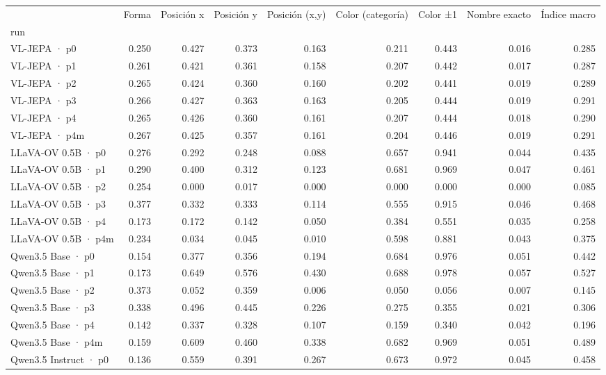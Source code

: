 \begin{tabular}{lrrrrrrrr}
\toprule
 & Forma & Posición x & Posición y & Posición (x,y) & Color (categoría) & Color ±1 & Nombre exacto & Índice macro \\
run &  &  &  &  &  &  &  &  \\
\midrule
VL-JEPA · p0 & 0.250 & 0.427 & 0.373 & 0.163 & 0.211 & 0.443 & 0.016 & 0.285 \\
VL-JEPA · p1 & 0.261 & 0.421 & 0.361 & 0.158 & 0.207 & 0.442 & 0.017 & 0.287 \\
VL-JEPA · p2 & 0.265 & 0.424 & 0.360 & 0.160 & 0.202 & 0.441 & 0.019 & 0.289 \\
VL-JEPA · p3 & 0.266 & 0.427 & 0.363 & 0.163 & 0.205 & 0.444 & 0.019 & 0.291 \\
VL-JEPA · p4 & 0.265 & 0.426 & 0.360 & 0.161 & 0.207 & 0.444 & 0.018 & 0.290 \\
VL-JEPA · p4m & 0.267 & 0.425 & 0.357 & 0.161 & 0.204 & 0.446 & 0.019 & 0.291 \\
LLaVA-OV 0.5B · p0 & 0.276 & 0.292 & 0.248 & 0.088 & 0.657 & 0.941 & 0.044 & 0.435 \\
LLaVA-OV 0.5B · p1 & 0.290 & 0.400 & 0.312 & 0.123 & 0.681 & 0.969 & 0.047 & 0.461 \\
LLaVA-OV 0.5B · p2 & 0.254 & 0.000 & 0.017 & 0.000 & 0.000 & 0.000 & 0.000 & 0.085 \\
LLaVA-OV 0.5B · p3 & 0.377 & 0.332 & 0.333 & 0.114 & 0.555 & 0.915 & 0.046 & 0.468 \\
LLaVA-OV 0.5B · p4 & 0.173 & 0.172 & 0.142 & 0.050 & 0.384 & 0.551 & 0.035 & 0.258 \\
LLaVA-OV 0.5B · p4m & 0.234 & 0.034 & 0.045 & 0.010 & 0.598 & 0.881 & 0.043 & 0.375 \\
Qwen3.5 Base · p0 & 0.154 & 0.377 & 0.356 & 0.194 & 0.684 & 0.976 & 0.051 & 0.442 \\
Qwen3.5 Base · p1 & 0.173 & 0.649 & 0.576 & 0.430 & 0.688 & 0.978 & 0.057 & 0.527 \\
Qwen3.5 Base · p2 & 0.373 & 0.052 & 0.359 & 0.006 & 0.050 & 0.056 & 0.007 & 0.145 \\
Qwen3.5 Base · p3 & 0.338 & 0.496 & 0.445 & 0.226 & 0.275 & 0.355 & 0.021 & 0.306 \\
Qwen3.5 Base · p4 & 0.142 & 0.337 & 0.328 & 0.107 & 0.159 & 0.340 & 0.042 & 0.196 \\
Qwen3.5 Base · p4m & 0.159 & 0.609 & 0.460 & 0.338 & 0.682 & 0.969 & 0.051 & 0.489 \\
Qwen3.5 Instruct · p0 & 0.136 & 0.559 & 0.391 & 0.267 & 0.673 & 0.972 & 0.045 & 0.458 \\

\end{tabular}
